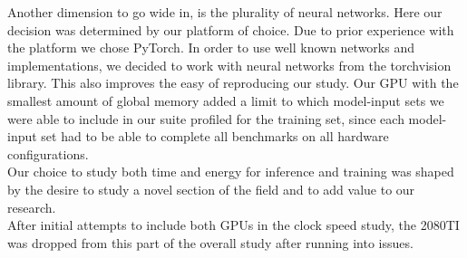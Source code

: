 Another dimension to go wide in, is the plurality of neural networks. Here our decision was determined by our platform of choice. Due to prior experience with the platform we chose PyTorch. In order to use well known networks and implementations, we decided to work with neural networks from the torchvision library. This also improves the easy of reproducing our study. Our GPU with the smallest amount of global memory added a limit to which model-input sets we were able to include in our suite profiled for the training set, since each model-input set had to be able to complete all benchmarks on all hardware configurations. \\
Our choice to study both time and energy for inference and training was shaped by the desire to study a novel section of the field and to add value to our research.  \\
After initial attempts to include both GPUs in the clock speed study, the 2080TI was dropped from this part of the overall study after running into issues.\\
